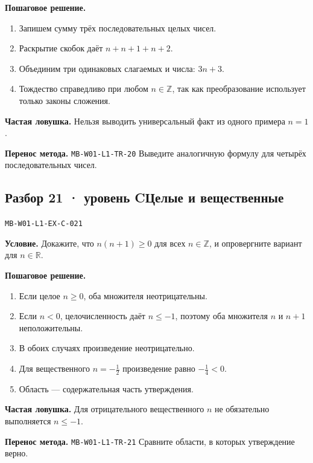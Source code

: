 \documentclass[11pt,a4paper,openany]{book}
\newcommand{\mtag}[1]{\textsf{\small\color{mbaccent}\bfseries #1}}
\newcommand{\muid}[1]{\texttt{\footnotesize #1}}
\begin{document}
\textbf{Пошаговое решение.}\par
\begin{enumerate}[label=\arabic*),leftmargin=*,itemsep=3pt,topsep=4pt]
\item Запишем сумму трёх последовательных целых чисел.
\item Раскрытие скобок даёт $n+n+1+n+2$.
\item Объединим три одинаковых слагаемых и числа: $3n+3$.
\item Тождество справедливо при любом $n\in\mathbb Z$, так как преобразование использует только законы сложения.
\end{enumerate}


\begin{learnbox}\textbf{Частая ловушка.} Нельзя выводить универсальный факт из одного примера $n=1$.\par \textbf{Перенос метода.} \muid{MB-W01-L1-TR-20} Выведите аналогичную формулу для четырёх последовательных чисел.\end{learnbox}

\subsection*{\mtag{Разбор 21 · уровень C}\quad Целые и вещественные}\hypertarget{MB-W01-L1-EX-C-021}{}

\muid{MB-W01-L1-EX-C-021}\par

\begin{keybox}\textbf{Условие.} Докажите, что $n(n+1)\ge0$ для всех $n\in\mathbb Z$, и опровергните вариант для $n\in\mathbb R$.\end{keybox}

\textbf{Пошаговое решение.}\par
\begin{enumerate}[label=\arabic*),leftmargin=*,itemsep=3pt,topsep=4pt]
\item Если целое $n\ge0$, оба множителя неотрицательны.
\item Если $n<0$, целочисленность даёт $n\le-1$, поэтому оба множителя $n$ и $n+1$ неположительны.
\item В обоих случаях произведение неотрицательно.
\item Для вещественного $n=-\tfrac12$ произведение равно $-\tfrac14<0$.
\item Область — содержательная часть утверждения.
\end{enumerate}


\begin{learnbox}\textbf{Частая ловушка.} Для отрицательного вещественного $n$ не обязательно выполняется $n\le-1$.\par \textbf{Перенос метода.} \muid{MB-W01-L1-TR-21} Сравните области, в которых утверждение верно.\end{learnbox}
\end{document}
